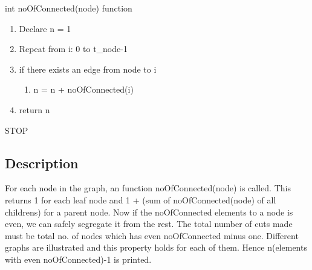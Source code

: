 \documentclass{article}
\begin{document}
\newline\newline\newline
int noOfConnected(node) function
\begin{flushleft}
\begin{enumerate}
\item Declare n = 1
\item Repeat from i: 0 to t\_node-1
\item if there exists an edge from node to i
\begin{flushleft}
\begin{enumerate}
    \item n = n + noOfConnected(i)
\end{enumerate}
\end{flushleft}
\item return n

\end{enumerate}
\end{flushleft}
STOP
\subsection{Description}
For each node in the graph, an function noOfConnected(node) is called. This returns 1 for each leaf node and 1 + (sum of noOfConnected(node) of all childrens) for a parent node. Now if the noOfConnected elements to a node is even, we can safely segregate it from the rest. The total number of cuts made must be total no. of nodes which has even noOfConnected minus one. Different graphs are illustrated and this property holds for each of them. Hence n(elements with even noOfConnected)-1 is printed.
\end{document}
